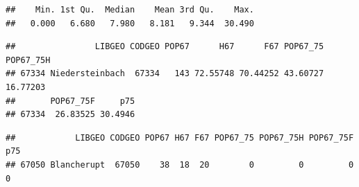 \documentclass[]{article}
\newenvironment{Shaded}{\begin{snugshade}}{\end{snugshade}}
\newcommand{\KeywordTok}[1]{\textcolor[rgb]{0.13,0.29,0.53}{\textbf{{#1}}}}
\newcommand{\DataTypeTok}[1]{\textcolor[rgb]{0.13,0.29,0.53}{{#1}}}
\newcommand{\DecValTok}[1]{\textcolor[rgb]{0.00,0.00,0.81}{{#1}}}
\newcommand{\StringTok}[1]{\textcolor[rgb]{0.31,0.60,0.02}{{#1}}}
\newcommand{\CommentTok}[1]{\textcolor[rgb]{0.56,0.35,0.01}{\textit{{#1}}}}
\newcommand{\NormalTok}[1]{{#1}}
\begin{document}
\begin{Shaded}
\end{Shaded}

\begin{verbatim}
##    Min. 1st Qu.  Median    Mean 3rd Qu.    Max. 
##   0.000   6.680   7.980   8.181   9.344  30.490
\end{verbatim}

\begin{Shaded}
\end{Shaded}

\begin{verbatim}
##                LIBGEO CODGEO POP67      H67      F67 POP67_75 POP67_75H
## 67334 Niedersteinbach  67334   143 72.55748 70.44252 43.60727  16.77203
##       POP67_75F     p75
## 67334  26.83525 30.4946
\end{verbatim}

\begin{Shaded}
\end{Shaded}

\begin{verbatim}
##            LIBGEO CODGEO POP67 H67 F67 POP67_75 POP67_75H POP67_75F p75
## 67050 Blancherupt  67050    38  18  20        0         0         0   0
\end{verbatim}
\end{document}

